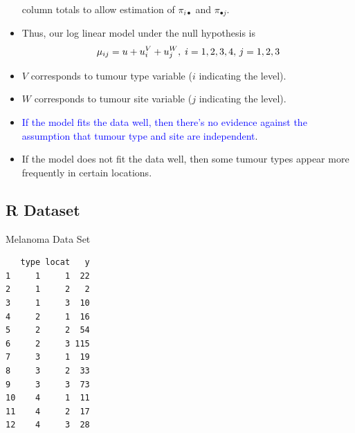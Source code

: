 \documentclass{article}\usepackage[]{graphicx}\usepackage[svgnames]{xcolor}
\makeatletter
\newenvironment{kframe}{%
 \def\at@end@of@kframe{}%
 \ifinner\ifhmode%
  \def\at@end@of@kframe{\end{minipage}}%
  \begin{minipage}{\columnwidth}%
 \fi\fi%
 \def\FrameCommand##1{\hskip\@totalleftmargin \hskip-\fboxsep
 \colorbox{shadecolor}{##1}\hskip-\fboxsep
     \hskip-\linewidth \hskip-\@totalleftmargin \hskip\columnwidth}%
 \MakeFramed {\advance\hsize-\width
   \@totalleftmargin\z@ \linewidth\hsize
   \@setminipage}}%
 {\par\unskip\endMakeFramed%
 \at@end@of@kframe}
\newenvironment{knitrout}{}{} %
\let\log\relax%
\makeatother
\begin{document}
\begin{itemize}
            column totals to allow estimation of $ \pi_{i\bullet} $ and $ \pi_{\bullet j} $.
      \item Thus, our log linear model under the null hypothesis is
            \[ \log{\mu_{ij}}=u+u_i^V+u_j^W,\; i=1,2,3,4,\,j=1,2,3 \]
      \item $V$ corresponds to tumour type variable ($i$ indicating the level).
      \item $W$ corresponds to tumour site variable ($j$ indicating the level).
      \item \textcolor{Blue}{If the model fits the data well, then there's no evidence against the assumption
                  that tumour type and site are independent}.
      \item If the model does not fit the data well, then some tumour types appear more
            frequently in certain locations.
\end{itemize}
\subsection*{R Dataset}
\begin{Example}{Melanoma Data Set}
\begin{knitrout}
\color{fgcolor}\begin{kframe}
\begin{verbatim}
   type locat   y
1     1     1  22
2     1     2   2
3     1     3  10
4     2     1  16
5     2     2  54
6     2     3 115
7     3     1  19
8     3     2  33
9     3     3  73
10    4     1  11
11    4     2  17
12    4     3  28
\end{verbatim}
\end{kframe}
\end{knitrout}
\end{Example}
\end{document}
